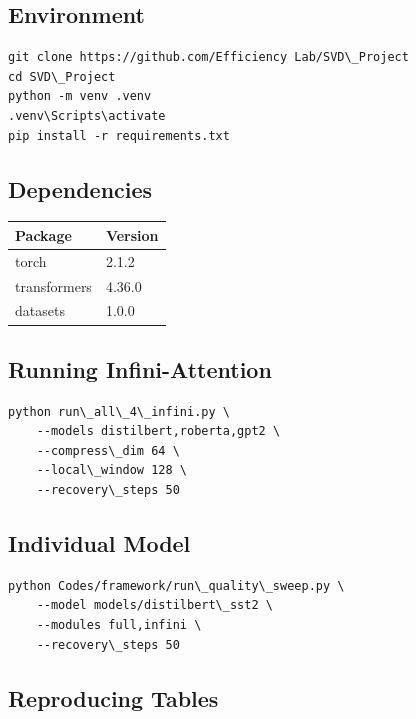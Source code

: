 \subsection{Environment}

\begin{lstlisting}
git clone https://github.com/Efficiency Lab/SVD\_Project
cd SVD\_Project
python -m venv .venv
.venv\Scripts\activate
pip install -r requirements.txt
\end{lstlisting}

\subsection{Dependencies}

\begin{table}[H]
\centering
\small
\begin{tabular}{ll}
\toprule
\textbf{Package} & \textbf{Version} \\
\midrule
torch & 2.1.2 \\
transformers & 4.36.0 \\
datasets & 1.0.0 \\
\bottomrule
\end{tabular}
\end{table}

\subsection{Running Infini-Attention}

\begin{lstlisting}
python run\_all\_4\_infini.py \
    --models distilbert,roberta,gpt2 \
    --compress\_dim 64 \
    --local\_window 128 \
    --recovery\_steps 50
\end{lstlisting}

\subsection{Individual Model}

\begin{lstlisting}
python Codes/framework/run\_quality\_sweep.py \
    --model models/distilbert\_sst2 \
    --modules full,infini \
    --recovery\_steps 50
\end{lstlisting}

\subsection{Reproducing Tables}

